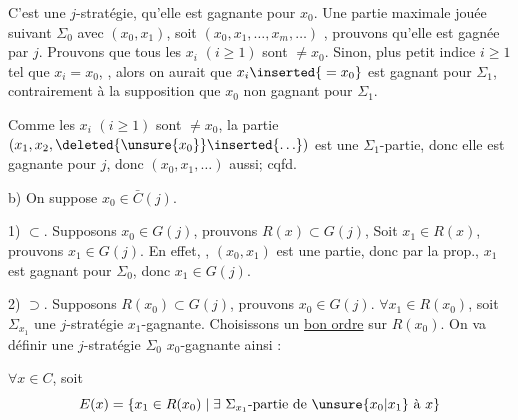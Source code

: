 C'est une $j$-stratégie,   qu'elle est gagnante pour $x_0$.  Une partie maximale jouée suivant $\Sigma_0$  avec $(x_0,x_1)$, soit $(x_0,x_1,\ldots,x_m,\ldots)$ , prouvons qu'elle est gagnée par $j$. Prouvons que tous les $x_i$ $(i\geq1)$ sont $\ne x_0$. Sinon,  plus petit indice $i\geq1$ tel que $x_i=x_0$, , alors   on aurait que $x_i\inserted{{}=x_0}$ est gagnant pour $\Sigma_1$, contrairement à la supposition que $x_0$ non gagnant pour $\Sigma_1$.

Comme les $x_i$ $(i\geq1)$ sont $\ne x_0$, la partie $(x_1,x_2,\deleted{\unsure{x_0}}\inserted{\ldots})$ est une $\Sigma_1$-partie, donc elle est gagnante pour $j$, donc $(x_0,x_1,\ldots)$ aussi; cqfd.

b) On suppose $x_0\in\bar C(j)$.

1) $\subset$. Supposons $x_0\in G(j)$, prouvons $R(x)\subset G(j)$, Soit $x_1\in R(x)$, prouvons $x_1\in G(j)$. En effet, , $(x_0,x_1)$ est une partie, donc par la prop., $x_1$ est gagnant pour $\Sigma_0$, donc $x_1\in G(j)$.

2) $\supset$. Supposons $R(x_0)\subset G(j)$, prouvons $x_0\in G(j)$. $\forall x_1\in R(x_0)$, soit $\Sigma_{x_1}$ une $j$-stratégie $x_1$-gagnante. Choisissons un \uline{bon ordre} sur $R(x_0)$. On va définir une $j$-stratégie $\Sigma_0$ $x_0$-gagnante ainsi :

$\forall x\in C$, soit
\[
E(x)=\{x_1\in R(x_0)\mid\exists\ \Sigma_{x_1}\text{-partie de }\unsure{x_0|x_1}\text{ à }x\}
\]
